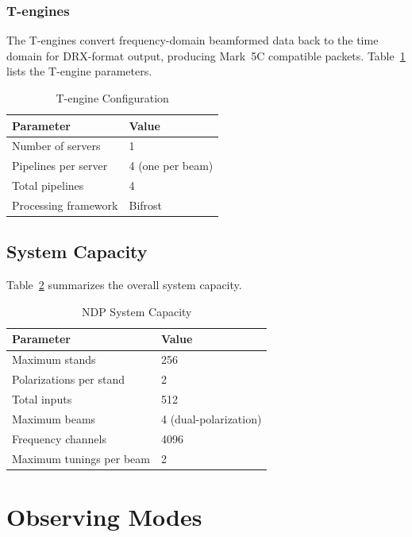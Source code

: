 \subsubsection{T-engines}

The T-engines convert frequency-domain beamformed data back to the time domain for DRX-format output, producing Mark~5C compatible packets.  Table~\ref{tab:tengine-config} lists the T-engine parameters.

\begin{table}[htbp]
    \centering
    \caption{T-engine Configuration}
    \label{tab:tengine-config}
    \begin{tabular}{ll}
        \toprule
        \textbf{Parameter} & \textbf{Value} \\
        \midrule
        Number of servers & 1 \\
        Pipelines per server & 4 (one per beam) \\
        Total pipelines & 4 \\
        Processing framework & Bifrost \\
        \bottomrule
    \end{tabular}
\end{table}

\subsection{System Capacity}

Table~\ref{tab:system-capacity} summarizes the overall system capacity.

\begin{table}[htbp]
    \centering
    \caption{NDP System Capacity}
    \label{tab:system-capacity}
    \begin{tabular}{ll}
        \toprule
        \textbf{Parameter} & \textbf{Value} \\
        \midrule
        Maximum stands & 256 \\
        Polarizations per stand & 2 \\
        Total inputs & 512 \\
        Maximum beams & 4 (dual-polarization) \\
        Frequency channels & 4096 \\
        Maximum tunings per beam & 2 \\
        \bottomrule
    \end{tabular}
\end{table}

\section{Observing Modes}

